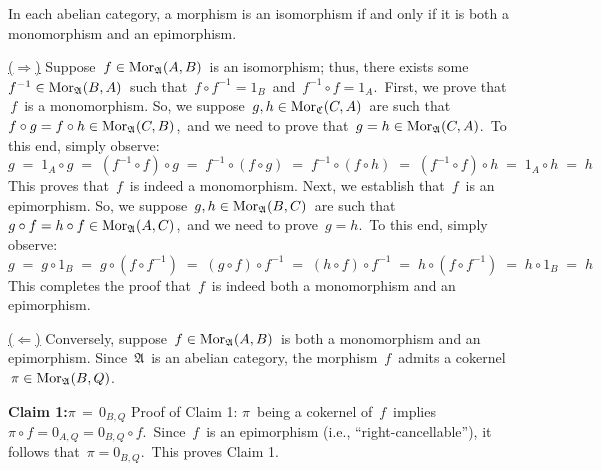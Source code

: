 \vskip 0.5cm
\begin{proposition}
\label{AbelianImpliesIsomorphismIFFMonoEpi}
\mbox{}
\vskip 0.1cm
\noindent
In each abelian category, a morphism is an isomorphism if and only if
it is both a monomorphism and an epimorphism.
\end{proposition}
\proof
\vskip 0.1cm
\noindent
\underline{($\Longrightarrow$)}
\vskip 0.2cm
\noindent
Suppose \,$f \in \textnormal{Mor}_{\mathfrak{A}}(A,B)$\, is an isomorphism; thus, there exists some
\,$f^{-1} \in \textnormal{Mor}_{\mathfrak{A}}(B,A)$\,
such that
\,$f \circ f^{-1} = 1_{B}$\, and \,$f^{-1} \circ f = 1_{A}$.\,
First, we prove that \,$f$\, is a monomorphism.
So, we suppose
\,$g, h \in \textnormal{Mor}_{\mathfrak{C}}(C,A)$\,
are such that
\,$f \circ g = f \circ h \in \textnormal{Mor}_{\mathfrak{A}}(C,B)$,\,
and we need to prove that \,$g = h \in \textnormal{Mor}_{\mathfrak{A}}(C,A)$.\,
To this end, simply observe:
\begin{equation*}
g
\; = \;
	1_{A} \circ g
\; = \;
	(f^{-1} \circ f) \circ g
\; = \;
	f^{-1} \circ (f \circ g)
\; = \;
	f^{-1} \circ (f \circ h)
\; = \;
	(f^{-1} \circ f) \circ h
\; = \;
	1_{A} \circ h
\; = \;
	h
\end{equation*}
This proves that \,$f$\, is indeed a monomorphism.
Next, we establish that \,$f$\, is an epimorphism.
So, we suppose
\,$g, h \in \textnormal{Mor}_{\mathfrak{A}}(B,C)$\,
are such that
\,$g \circ f = h \circ f \in \textnormal{Mor}_{\mathfrak{A}}(A,C)$,\,
and we need to prove
\,$g = h$.\,
To this end, simply observe:
\begin{equation*}
g
\; = \;
	g \circ 1_{B}
\; = \;
	g \circ (f \circ f^{-1})
\; = \;
	(g \circ f) \circ f^{-1}
\; = \;
	(h \circ f) \circ f^{-1}
\; = \;
	h \circ (f \circ f^{-1})
\; = \;
	h \circ 1_{B}
\; = \;
	h
\end{equation*}
This completes the proof that \,$f$\, is indeed both a monomorphism and an epimorphism.

\vskip 0.3cm
\noindent
\underline{($\Longleftarrow$)}
\vskip 0.2cm
\noindent
Conversely, suppose \,$f \in \textnormal{Mor}_{\mathfrak{A}}(A,B)$\, is both a monomorphism and an epimorphism.
Since \,$\mathfrak{A}$\, is an abelian category, the morphism \,$f$\, admits a cokernel
\,$\pi \in \textnormal{Mor}_{\mathfrak{A}}(B,Q)$.\,

\vskip 0.3cm
\noindent
\textbf{Claim 1:}\quad $\pi \,=\, 0_{B,Q}$
\vskip 0.1cm
\noindent
Proof of Claim 1:\;\;
$\pi$\, being a cokernel of \,$f$\, implies
\,$\pi \circ f = 0_{A,Q} = 0_{B,Q} \circ f$.\,
Since \,$f$\, is an epimorphism (i.e., ``right-cancellable''), it follows that
\,$\pi = 0_{B,Q}$.\,
This proves Claim 1.

